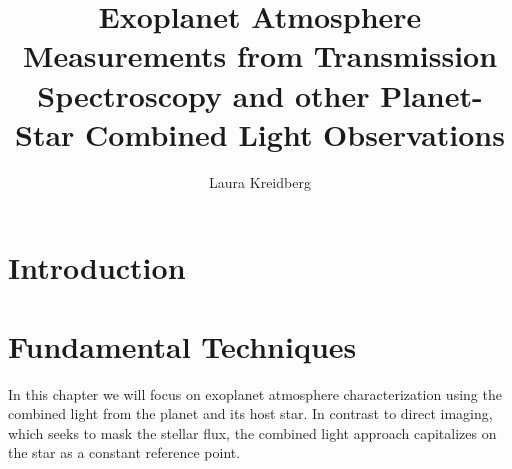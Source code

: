 \documentclass[graybox,natbib,nosecnum]{svmult}
\begin{document}
\title*{Exoplanet Atmosphere Measurements from Transmission Spectroscopy and other Planet-Star Combined Light Observations}
\author{Laura Kreidberg}
%
%
\maketitle




\section{Introduction }



\section{Fundamental Techniques} 
In this chapter we will focus on exoplanet atmosphere characterization using the combined light from the planet and its host star. In contrast to direct imaging, which seeks to mask the stellar flux, the combined light approach capitalizes on the star as a constant reference point. 
\end{document}
